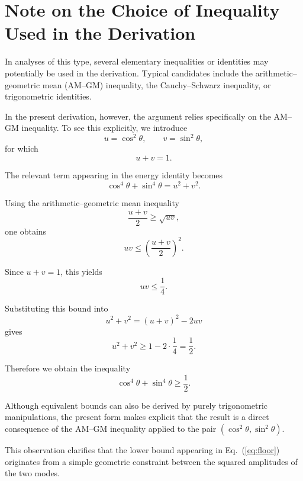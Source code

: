 \documentclass[%
 reprint, amsmath,amssymb, aps, prb, ]{revtex4-2}
\numberwithin{equation}{section}
\begin{document}
\appendix

\section{Note on the Choice of Inequality Used in the Derivation}

In analyses of this type, several elementary inequalities or identities
may potentially be used in the derivation.
Typical candidates include the arithmetic–geometric mean (AM–GM) inequality,
the Cauchy–Schwarz inequality, or trigonometric identities.

In the present derivation, however, the argument relies specifically on the
AM–GM inequality.  To see this explicitly, we introduce
\[
u=\cos^2\theta, \qquad v=\sin^2\theta ,
\]
for which
\[
u+v=1 .
\]

The relevant term appearing in the energy identity becomes
\[
\cos^4\theta+\sin^4\theta = u^2+v^2 .
\]

Using the arithmetic–geometric mean inequality
\[
\frac{u+v}{2} \ge \sqrt{uv},
\]
one obtains
\[
uv \le \left(\frac{u+v}{2}\right)^2 .
\]

Since $u+v=1$, this yields
\[
uv \le \frac14 .
\]

Substituting this bound into
\[
u^2+v^2=(u+v)^2-2uv
\]
gives
\[
u^2+v^2 \ge 1-2\cdot\frac14=\frac12 .
\]

Therefore we obtain the inequality
\[
\cos^4\theta+\sin^4\theta \ge \frac12 .
\]

Although equivalent bounds can also be derived by purely trigonometric
manipulations, the present form makes explicit that the result is a direct
consequence of the AM–GM inequality applied to the pair
$(\cos^2\theta,\sin^2\theta)$.

This observation clarifies that the lower bound appearing in
Eq.~(\ref{eq:floor}) originates from a simple geometric constraint
between the squared amplitudes of the two modes.
\end{document}
